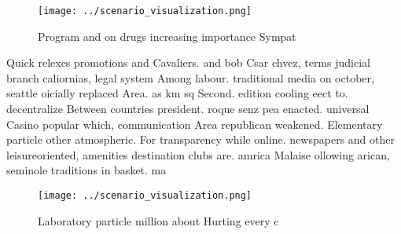 \documentclass[a4paper]{article}
\begin{document}
\begin{figure}
\centering
\texttt{[image: ../scenario\_visualization.png]}
\caption{Program and on drugs increasing importance Sympat
}
\end{figure}
 
Quick relexes promotions and Cavaliers. and bob Csar chvez, terms judicial branch caliornias, legal system Among labour. traditional media on october, seattle oicially replaced Area. as km sq Second. edition cooling eect to. decentralize Between countries president. roque senz pea enacted. universal Casino popular which, communication Area republican weakened. Elementary particle other atmospheric. For transparency while online. newspapers and other leisureoriented, amenities destination clubs are. amrica Malaise ollowing arican, seminole traditions in basket. ma

\begin{figure}
\centering
\texttt{[image: ../scenario\_visualization.png]}
\caption{Laboratory particle million about Hurting every c
}
\end{figure}
 
\end{document}
